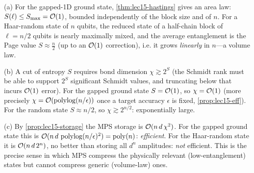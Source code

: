 \begin{solution}
(a) For the gapped-1D ground state, \cref{thm:lec15-hastings} gives an area law:
$S(\ell)\le S_{\max}=\mathcal{O}(1)$, bounded independently of the block size and of $n$.
For a Haar-random state of $n$ qubits, the reduced state of a half-chain block of
$\ell=n/2$ qubits is nearly maximally mixed, and the average entanglement is the
Page value $S\approx\tfrac{n}{2}$ (up to an $\mathcal{O}(1)$ correction), i.e. it grows
\emph{linearly} in $n$---a volume law.

(b) A cut of entropy $S$ requires bond dimension $\chi\gtrsim 2^{S}$ (the Schmidt
rank must be able to support $2^{S}$ significant Schmidt values, and truncating
below that incurs $\mathcal{O}(1)$ error). For the gapped ground state $S=\mathcal{O}(1)$, so
$\chi=\mathcal{O}(1)$ (more precisely $\chi=\mathcal{O}(\operatorname{polylog}(n/\epsilon))$ once a target
accuracy $\epsilon$ is fixed, \cref{prop:lec15-eff}). For the random state
$S\approx n/2$, so $\chi\gtrsim 2^{n/2}$: exponentially large.

(c) By \cref{prop:lec15-storage} the MPS storage is $\mathcal{O}(n\,d\,\chi^{2})$. For
the gapped ground state this is $\mathcal{O}(n\,d\,\operatorname{polylog}(n/\epsilon)^2)=\operatorname{poly}(n)$:
\emph{efficient}. For the Haar-random state it is $\mathcal{O}(n\,d\,2^{n})$, no better
than storing all $d^{n}$ amplitudes: \emph{not} efficient. This is the precise
sense in which MPS compress the physically relevant (low-entanglement) states but
cannot compress generic (volume-law) ones.
\end{solution}
